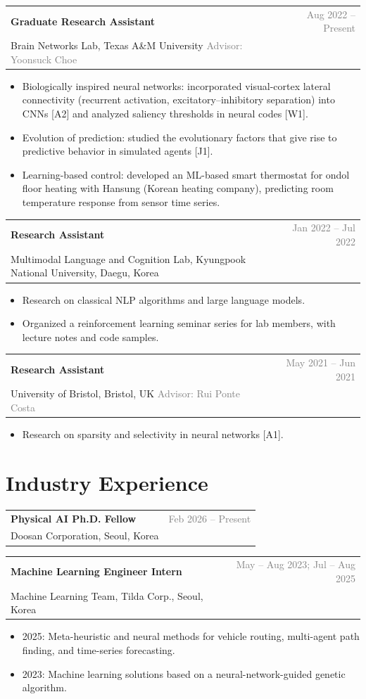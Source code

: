 \documentclass[10pt,letterpaper]{article}
\makeatletter
\newcommand{\entry}[3]{%
  \par\vspace{4pt}%
  \begin{tabularx}{\textwidth}{@{}X@{\hspace{1em}}r@{}}
    \textbf{#1} & \textcolor{gray}{#2}\\
    {#3} & \\
  \end{tabularx}\par\vspace{-2pt}}
\makeatother
\begin{document}
\entry{Graduate Research Assistant}{Aug 2022 -- Present}
      {Brain Networks Lab, Texas A\&M University \quad\textcolor{gray}{Advisor: Yoonsuck Choe}}
\begin{itemize}
  \item Biologically inspired neural networks: incorporated visual-cortex lateral connectivity (recurrent activation, excitatory--inhibitory separation) into CNNs [A2] and analyzed saliency thresholds in neural codes [W1].
  \item Evolution of prediction: studied the evolutionary factors that give rise to predictive behavior in simulated agents [J1].
  \item Learning-based control: developed an ML-based smart thermostat for ondol floor heating with Hansung (Korean heating company), predicting room temperature response from sensor time series.
\end{itemize}

\entry{Research Assistant}{Jan 2022 -- Jul 2022}
      {Multimodal Language and Cognition Lab, Kyungpook National University, Daegu, Korea}
\begin{itemize}
  \item Research on classical NLP algorithms and large language models.
  \item Organized a reinforcement learning seminar series for lab members, with lecture notes and code samples.
\end{itemize}

\entry{Research Assistant}{May 2021 -- Jun 2021}
      {University of Bristol, Bristol, UK \quad\textcolor{gray}{Advisor: Rui Ponte Costa}}
\begin{itemize}
  \item Research on sparsity and selectivity in neural networks [A1].
\end{itemize}

\section{Industry Experience}

\entry{Physical AI Ph.D. Fellow}{Feb 2026 -- Present}
      {Doosan Corporation, Seoul, Korea}

\entry{Machine Learning Engineer Intern}{May -- Aug 2023; Jul -- Aug 2025}
      {Machine Learning Team, Tilda Corp., Seoul, Korea}
\begin{itemize}
  \item 2025: Meta-heuristic and neural methods for vehicle routing, multi-agent path finding, and time-series forecasting.
  \item 2023: Machine learning solutions based on a neural-network-guided genetic algorithm.
\end{itemize}
\end{document}
